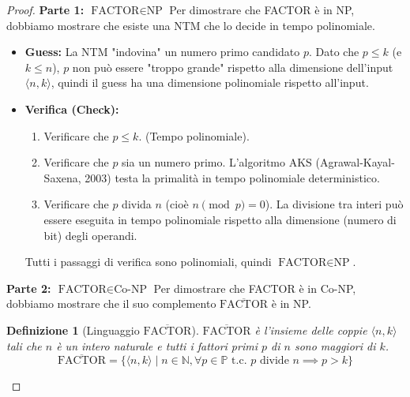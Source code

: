 \documentclass[a4paper]{article}
\newtheorem{definition}{Definizione}
\begin{document}
\begin{proof}
\textbf{Parte 1: $\text{FACTOR} \in \text{NP}$}
Per dimostrare che FACTOR è in NP, dobbiamo mostrare che esiste una NTM che lo decide in tempo polinomiale.
\begin{itemize}
    \item \textbf{Guess:} La NTM "indovina" un numero primo candidato $p$. Dato che $p \le k$ (e $k \le n$), $p$ non può essere "troppo grande" rispetto alla dimensione dell'input $\langle n, k \rangle$, quindi il guess ha una dimensione polinomiale rispetto all'input.
    \item \textbf{Verifica (Check):}
    \begin{enumerate}
        \item Verificare che $p \le k$. (Tempo polinomiale).
        \item Verificare che $p$ sia un numero primo. L'algoritmo AKS (Agrawal-Kayal-Saxena, 2003) testa la primalità in tempo polinomiale deterministico.
        \item Verificare che $p$ divida $n$ (cioè $n \pmod p = 0$). La divisione tra interi può essere eseguita in tempo polinomiale rispetto alla dimensione (numero di bit) degli operandi.
    \end{enumerate}
    Tutti i passaggi di verifica sono polinomiali, quindi $\text{FACTOR} \in \text{NP}$.
\end{itemize}

\textbf{Parte 2: $\text{FACTOR} \in \text{Co-NP}$}
Per dimostrare che FACTOR è in Co-NP, dobbiamo mostrare che il suo complemento $\overline{\text{FACTOR}}$ è in NP.

\begin{definition}[Linguaggio $\overline{\text{FACTOR}}$]
$\overline{\text{FACTOR}}$ è l'insieme delle coppie $\langle n, k \rangle$ tali che $n$ è un intero naturale e \textit{tutti} i fattori primi $p$ di $n$ sono maggiori di $k$.
\[
\overline{\text{FACTOR}} = \{ \langle n, k \rangle \mid n \in \mathbb{N}, \forall p \in \mathbb{P} \text{ t.c. } p \text{ divide } n \implies p > k \}
\]
\end{definition}


\end{proof}
\end{document}
